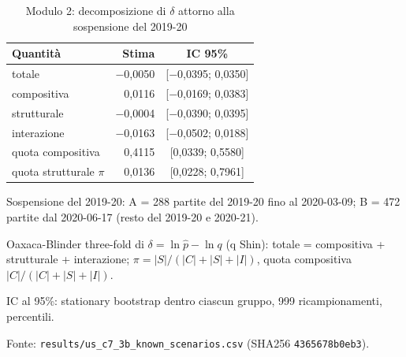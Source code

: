 \begin{table}[htbp]
\centering
\small
\caption{Modulo 2: decomposizione di $\delta$ attorno alla sospensione del 2019-20}
\label{tab:modulo2_covid}
\begin{tabular}{lrc}
\toprule
Quantità & Stima & IC 95\% \\
\midrule
totale & $-$0,0050 & [$-$0,0395; 0,0350] \\
compositiva & 0,0116 & [$-$0,0169; 0,0383] \\
strutturale & $-$0,0004 & [$-$0,0390; 0,0395] \\
interazione & $-$0,0163 & [$-$0,0502; 0,0188] \\
quota compositiva & 0,4115 & [0,0339; 0,5580] \\
quota strutturale $\pi$ & 0,0136 & [0,0228; 0,7961] \\
\bottomrule
\end{tabular}

\smallskip
\begin{minipage}{\linewidth}
\footnotesize
Sospensione del 2019-20: A = 288 partite del 2019-20 fino al 2020-03-09; B = 472 partite dal 2020-06-17 (resto del 2019-20 e 2020-21).\par
Oaxaca-Blinder three-fold di $\delta = \ln \hat p - \ln q$ (q Shin): totale = compositiva + strutturale + interazione; $\pi = |S| / (|C| + |S| + |I|)$, quota compositiva $|C| / (|C| + |S| + |I|)$.\par
IC al 95\%: stationary bootstrap dentro ciascun gruppo, 999 ricampionamenti, percentili.\par
Fonte: \texttt{results/us\_c7\_3b\_known\_scenarios.csv} (SHA256 \texttt{4365678b0eb3}).
\end{minipage}
\end{table}
